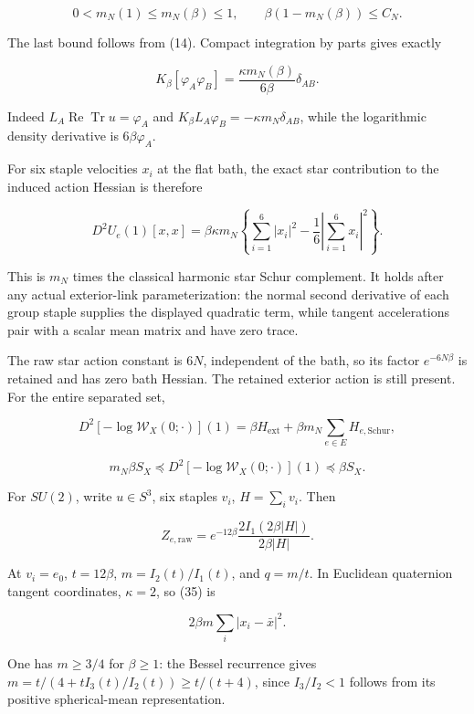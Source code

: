 \documentclass[
  11pt,
]{article}
\begin{document}
\[
 0<m_N(1)\le m_N(\beta)\le1,
 \qquad \beta(1-m_N(\beta))\le C_N.               \tag{33}
\]

The last bound follows from (14). Compact integration by parts gives
exactly

\[
 K_\beta[\varphi_A\varphi_B]
 =\frac{\kappa m_N(\beta)}{6\beta}\delta_{AB}.
                                                        \tag{34}
\]

Indeed \(L_A\operatorname{Re}\operatorname{Tr}u=\varphi_A\) and
\(K_\beta L_A\varphi_B=-\kappa m_N\delta_{AB}\), while the logarithmic
density derivative is \(6\beta\varphi_A\).

For six staple velocities \(x_i\) at the flat bath, the exact star
contribution to the induced action Hessian is therefore

\[
 D^2U_e(1)[x,x]
 =\beta\kappa m_N\left\{
     \sum_{i=1}^6|x_i|^2-\frac16\left|\sum_{i=1}^6x_i\right|^2
   \right\}.                                          \tag{35}
\]

This is \(m_N\) times the classical harmonic star Schur complement. It
holds after any actual exterior-link parameterization: the normal second
derivative of each group staple supplies the displayed quadratic term,
while tangent accelerations pair with a scalar mean matrix and have zero
trace.

The raw star action constant is \(6N\), independent of the bath, so its
factor \(e^{-6N\beta}\) is retained and has zero bath Hessian. The
retained exterior action is still present. For the entire separated set,

\[
 D^2[-\log\mathcal W_X(0;\cdot)](1)
 =\beta H_{\mathrm{ext}}+
   \beta m_N\sum_{e\in E}H_{e,\mathrm{Schur}},
\]

\[
 m_N\beta S_X\preceq D^2[-\log\mathcal W_X(0;\cdot)](1)
 \preceq\beta S_X.                                   \tag{36}
\]

For \(SU(2)\), write \(u\in S^3\), six staples \(v_i\),
\(H=\sum_i v_i\). Then

\[
 Z_{e,\mathrm{raw}}=e^{-12\beta}
 \frac{2I_1(2\beta|H|)}{2\beta|H|}.
\]

At \(v_i=e_0\), \(t=12\beta\), \(m=I_2(t)/I_1(t)\), and \(q=m/t\). In
Euclidean quaternion tangent coordinates, \(\kappa=2\), so (35) is

\[
 2\beta m\sum_i|x_i-\bar x|^2.                       \tag{37}
\]

One has \(m\ge3/4\) for \(\beta\ge1\): the Bessel recurrence gives
\(m=t/(4+tI_3(t)/I_2(t))\ge t/(t+4)\), since \(I_3/I_2<1\) follows from
its positive spherical-mean representation.
\end{document}
